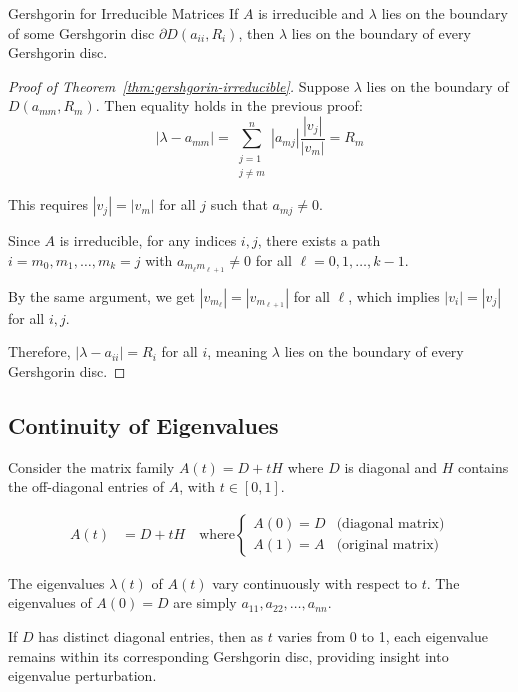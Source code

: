 \begin{theorem}{Gershgorin for Irreducible Matrices}{}
    If $A$ is irreducible and $\lambda$ lies on the boundary of some Gershgorin disc $\partial D(a_{ii}, R_i)$, then $\lambda$ lies on the boundary of every Gershgorin disc.
\end{theorem}
\begin{proof}[Proof of Theorem~\ref{thm:gershgorin-irreducible}]

    Suppose $\lambda$ lies on the boundary of $D(a_{mm}, R_m)$. Then equality holds in the previous proof:
    \begin{equation}
        |\lambda - a_{mm}| = \sum_{\substack{j=1 \\ j \neq m}}^n |a_{mj}|\frac{|v_j|}{|v_m|} = R_m
    \end{equation}

    This requires $|v_j| = |v_m|$ for all $j$ such that $a_{mj} \neq 0$.

    Since $A$ is irreducible, for any indices $i, j$, there exists a path $i = m_0, m_1, \ldots, m_k = j$ with $a_{m_\ell m_{\ell+1}} \neq 0$ for all $\ell = 0, 1, \ldots, k-1$.

    By the same argument, we get $|v_{m_\ell}| = |v_{m_{\ell+1}}|$ for all $\ell$, which implies $|v_i| = |v_j|$ for all $i, j$.

    Therefore, $|\lambda - a_{ii}| = R_i$ for all $i$, meaning $\lambda$ lies on the boundary of every Gershgorin disc.
\end{proof}

\subsection{Continuity of Eigenvalues}

Consider the matrix family $A(t) = D + tH$ where $D$ is diagonal and $H$ contains the off-diagonal entries of $A$, with $t \in [0,1]$.

\begin{align}
    A(t) & = D + tH \quad \text{where} \begin{cases}
                                           A(0) = D & \text{(diagonal matrix)} \\
                                           A(1) = A & \text{(original matrix)}
                                       \end{cases}
\end{align}

The eigenvalues $\lambda(t)$ of $A(t)$ vary continuously with respect to $t$. The eigenvalues of $A(0) = D$ are simply $a_{11}, a_{22}, \ldots, a_{nn}$.

If $D$ has distinct diagonal entries, then as $t$ varies from 0 to 1, each eigenvalue remains within its corresponding Gershgorin disc, providing insight into eigenvalue perturbation.